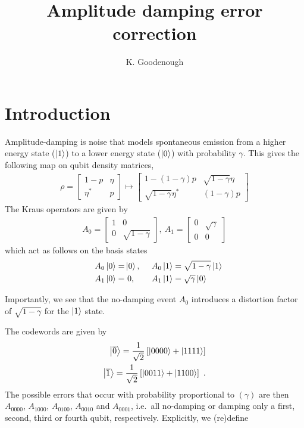 \documentclass[twoside]{article}
\begin{document}
\title{Amplitude damping error correction}
\author{K. Goodenough}

    \maketitle
\section*{Introduction}
\nonumber
Amplitude-damping is noise that models spontaneous emission from a higher energy state ($\Ket{1}$) to a lower energy state ($\Ket{0}$) with probability $\gamma$. This gives the following map on qubit density matrices,
\begin{gather}
\rho = \begin{bmatrix}
1-p & \eta\\
\eta^* & p
\end{bmatrix}
\mapsto 
\begin{bmatrix}
1-\left(1-\gamma\right)p & \sqrt{1-\gamma}\eta\\
\sqrt{1-\gamma}\eta^* & \left(1-\gamma\right)p
\end{bmatrix}
\end{gather}
The Kraus operators are given by
\begin{align}
A_0 = \begin{bmatrix}
1 & 0\\
0 & \sqrt{1-\gamma}
\end{bmatrix}
,~A_1 = \begin{bmatrix}
0 & \sqrt{\gamma}\\
0 & 0
\end{bmatrix}
\end{align}
which act as follows on the basis states
\begin{align}
~~~A_0\Ket{0} = &\Ket{0},~~~~A_0\Ket{1} = \sqrt{1-\gamma}\Ket{1}\\
\hspace*{-5mm}A_1\Ket{0} = &~0,~~~~~~A_1\Ket{1} = \sqrt{\gamma}\Ket{0}\label{eq:cheatsheet}\\
\end{align}

Importantly, we see that the no-damping event $A_0$ introduces a distortion factor of $\sqrt{1-\gamma}$ for the $\Ket{1}$ state.

The codewords are given by
\begin{align}
\Ket{\overline{0}} = \frac{1}{\sqrt{2}}\left[\Ket{0000}+\Ket{1111}\right]\\
\Ket{\overline{1}} = \frac{1}{\sqrt{2}}\left[\Ket{0011}+\Ket{1100}\right]\ .
\end{align}
The possible errors that occur with probability proportional to $(\gamma)$ are then $A_{0000}$, $A_{1000}$, $A_{0100}$, $A_{0010}$ and $A_{0001}$, i.e.~all no-damping or damping only a first, second, third or fourth qubit, respectively. Explicitly, we (re)define
\end{document}
